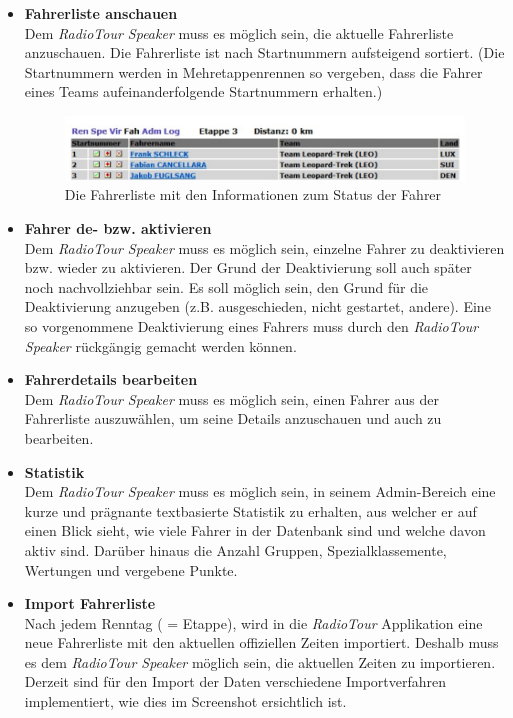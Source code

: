 \begin{itemize}
\item \textbf{Fahrerliste anschauen}\\
Dem \textit{RadioTour Speaker} muss es möglich sein, die aktuelle Fahrerliste anzuschauen. Die Fahrerliste ist nach Startnummern aufsteigend sortiert. (Die Startnummern werden in Mehretappenrennen so vergeben, dass die Fahrer eines Teams aufeinanderfolgende Startnummern erhalten.)

\begin{figure}[h!]
  \caption{Die Fahrerliste mit den Informationen zum Status der Fahrer}
  \begin{center}
    \includegraphics{05bericht/images/uc06_fahrerliste.png}
  \end{center}
\end{figure}

\item \textbf{Fahrer de- bzw. aktivieren}\\
Dem \textit{RadioTour Speaker} muss es möglich sein, einzelne Fahrer zu deaktivieren bzw. wieder zu aktivieren. Der Grund der Deaktivierung soll auch später noch nachvollziehbar sein. Es soll möglich sein, den Grund für die Deaktivierung anzugeben (z.B. ausgeschieden, nicht gestartet, andere).
Eine so vorgenommene Deaktivierung eines Fahrers muss durch den \textit{RadioTour Speaker} rückgängig gemacht werden können.

\item \textbf{Fahrerdetails bearbeiten}\\
Dem \textit{RadioTour Speaker} muss es möglich sein, einen Fahrer aus der Fahrerliste auszuwählen, um seine Details anzuschauen und auch zu bearbeiten. 

\item \textbf{Statistik}\\
Dem \textit{RadioTour Speaker} muss es möglich sein, in seinem Admin-Bereich eine kurze und prägnante textbasierte Statistik zu erhalten, aus welcher er auf einen Blick sieht, wie viele Fahrer in der Datenbank sind und welche davon aktiv sind. Darüber hinaus die Anzahl Gruppen, Spezialklassemente, Wertungen und vergebene Punkte.

\item \textbf{Import Fahrerliste}\\
Nach jedem Renntag ( = Etappe), wird in die \textit{RadioTour} Applikation eine neue Fahrerliste mit den aktuellen offiziellen Zeiten importiert. Deshalb muss es dem \textit{RadioTour Speaker} möglich sein, die aktuellen Zeiten zu importieren. Derzeit sind für den Import der Daten verschiedene Importverfahren implementiert, wie dies im Screenshot ersichtlich ist.


\end{itemize}
